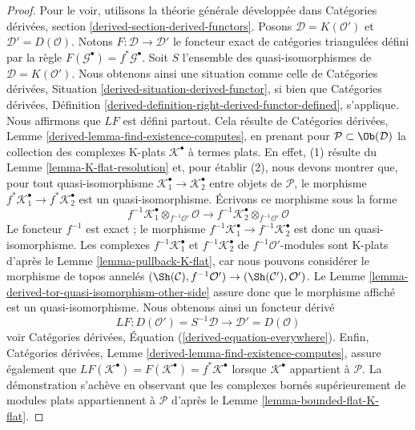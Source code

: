 \begin{proof}
Pour le voir, utilisons la théorie générale développée dans
Catégories dérivées, section \ref{derived-section-derived-functors}.
Posons $\mathcal{D} = K(\mathcal{O}')$ et $\mathcal{D}' = D(\mathcal{O})$.
Notons $F : \mathcal{D} \to \mathcal{D}'$ le foncteur exact de catégories
triangulées défini par la règle
$F(\mathcal{G}^\bullet) = f^*\mathcal{G}^\bullet$.
Soit $S$ l'ensemble des quasi-isomorphismes de
$\mathcal{D} = K(\mathcal{O}')$. Nous obtenons ainsi une situation comme
celle de Catégories dérivées, Situation
\ref{derived-situation-derived-functor}, si bien que Catégories dérivées,
Définition \ref{derived-definition-right-derived-functor-defined},
s'applique. Nous affirmons que $LF$ est défini partout. Cela résulte de
Catégories dérivées, Lemme \ref{derived-lemma-find-existence-computes},
en prenant pour $\mathcal{P} \subset \Ob(\mathcal{D})$ la collection des
complexes K-plats $\mathcal{K}^\bullet$ à termes plats. En effet, (1)
résulte du Lemme \ref{lemma-K-flat-resolution} et, pour établir (2), nous
devons montrer que, pour tout quasi-isomorphisme
$\mathcal{K}_1^\bullet  \to \mathcal{K}_2^\bullet$ entre objets de
$\mathcal{P}$, le morphisme
$f^*\mathcal{K}_1^\bullet  \to f^*\mathcal{K}_2^\bullet$ est un
quasi-isomorphisme. Écrivons ce morphisme sous la forme
$$
f^{-1}\mathcal{K}_1^\bullet \otimes_{f^{-1}\mathcal{O}'} \mathcal{O}
\longrightarrow
f^{-1}\mathcal{K}_2^\bullet \otimes_{f^{-1}\mathcal{O}'} \mathcal{O}
$$
Le foncteur $f^{-1}$ est exact ; le morphisme
$f^{-1}\mathcal{K}_1^\bullet  \to f^{-1}\mathcal{K}_2^\bullet$ est donc un
quasi-isomorphisme. Les complexes
 $f^{-1}\mathcal{K}_1^\bullet$ et $f^{-1}\mathcal{K}_2^\bullet$
de $f^{-1}\mathcal{O}'$-modules sont K-plats d'après le Lemme
\ref{lemma-pullback-K-flat}, car nous pouvons considérer le morphisme de
topos annelés
$(\Sh(\mathcal{C}), f^{-1}\mathcal{O}') \to
(\Sh(\mathcal{C}'), \mathcal{O}')$. Le Lemme
\ref{lemma-derived-tor-quasi-isomorphism-other-side} assure donc que le
morphisme affiché est un quasi-isomorphisme. Nous obtenons ainsi un
foncteur dérivé
$$
LF :
D(\mathcal{O}') = S^{-1}\mathcal{D}
\longrightarrow
\mathcal{D}' = D(\mathcal{O})
$$
voir Catégories dérivées, Équation (\ref{derived-equation-everywhere}).
Enfin, Catégories dérivées, Lemme
\ref{derived-lemma-find-existence-computes}, assure également que
$LF(\mathcal{K}^\bullet) = F(\mathcal{K}^\bullet) = f^*\mathcal{K}^\bullet$
lorsque $\mathcal{K}^\bullet$ appartient à $\mathcal{P}$.
La démonstration s'achève en observant que les complexes bornés
supérieurement de modules plats appartiennent à $\mathcal{P}$ d'après le
Lemme \ref{lemma-bounded-flat-K-flat}.
\end{proof}

